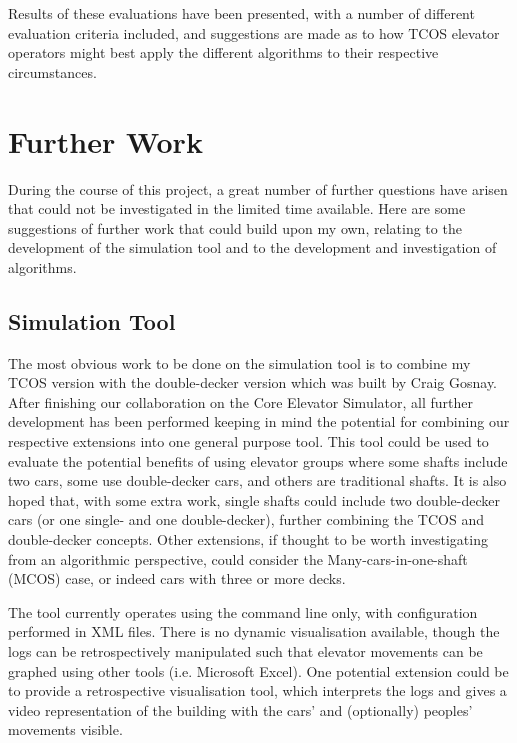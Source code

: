 \documentclass{UoYCSproject}
\begin{document}
Results of these evaluations have been presented, with a number of different evaluation criteria included, and suggestions are made as to how TCOS elevator operators might best apply the different algorithms to their respective circumstances.

\section{Further Work}

During the course of this project, a great number of further questions have arisen that could not be investigated in the limited time available.  Here are some suggestions of further work that could build upon my own, relating to the development of the simulation tool and to the development and investigation of algorithms.

\subsection{Simulation Tool}

The most obvious work to be done on the simulation tool is to combine my TCOS version with the double-decker version which was built by Craig Gosnay.  After finishing our collaboration on the Core Elevator Simulator, all further development has been performed keeping in mind the potential for combining our respective extensions into one general purpose tool.  This tool could be used to evaluate the potential benefits of using elevator groups where some shafts include two cars, some use double-decker cars, and others are traditional shafts.  It is also hoped that, with some extra work, single shafts could include two double-decker cars (or one single- and one double-decker), further combining the TCOS and double-decker concepts.  Other extensions, if thought to be worth investigating from an algorithmic perspective, could consider the Many-cars-in-one-shaft (MCOS) case, or indeed cars with three or more decks.

The tool currently operates using the command line only, with configuration performed in XML files.  There is no dynamic visualisation available, though the logs can be retrospectively manipulated such that elevator movements can be graphed using other tools (i.e. Microsoft Excel).  One potential extension could be to provide a retrospective visualisation tool, which interprets the logs and gives a video representation of the building with the cars' and (optionally) peoples' movements visible.
\end{document}
